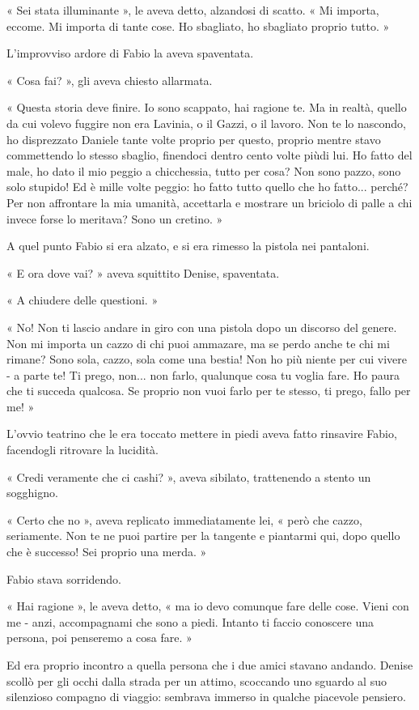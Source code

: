 « Sei stata illuminante », le aveva detto, alzandosi di scatto. « Mi importa, eccome. Mi importa di tante cose. Ho sbagliato, ho sbagliato proprio tutto. »

L'improvviso ardore di Fabio la aveva spaventata.

« Cosa fai? », gli aveva chiesto allarmata.

« Questa storia deve finire. Io sono scappato, hai ragione te. Ma in realtà, quello da cui volevo fuggire non era Lavinia, o il Gazzi, o il lavoro. Non te lo nascondo, ho disprezzato Daniele tante volte proprio per questo, proprio mentre stavo commettendo lo stesso sbaglio, finendoci dentro cento volte piùdi lui. Ho fatto del male, ho dato il mio peggio a chicchessia, tutto per cosa? Non sono pazzo, sono solo stupido! Ed è mille volte peggio: ho fatto tutto quello che ho fatto... perché? Per non affrontare la mia umanità, accettarla e mostrare un briciolo di palle a chi invece forse lo meritava? Sono un cretino. »

A quel punto Fabio si era alzato, e si era rimesso la pistola nei pantaloni.

« E ora dove vai? » aveva squittito Denise, spaventata.

« A chiudere delle questioni. »

« No! Non ti lascio andare in giro con una pistola dopo un discorso del genere. Non mi importa un cazzo di chi puoi ammazare, ma se perdo anche te chi mi rimane? Sono sola, cazzo, sola come una bestia! Non ho più niente per cui vivere - a parte te! Ti prego, non... non farlo, qualunque cosa tu voglia fare. Ho paura che ti succeda qualcosa. Se proprio non vuoi farlo per te stesso, ti prego, fallo per me! »

L'ovvio teatrino che le era toccato mettere in piedi aveva fatto rinsavire Fabio, facendogli ritrovare la lucidità.

« Credi veramente che ci cashi? », aveva sibilato, trattenendo a stento un sogghigno.

« Certo che no », aveva replicato immediatamente lei, « però che cazzo, seriamente. Non te ne puoi partire per la tangente e piantarmi qui, dopo quello che è successo! Sei proprio una merda. »

Fabio stava sorridendo.

« Hai ragione », le aveva detto, « ma io devo comunque fare delle cose. Vieni con me - anzi, accompagnami che sono a piedi. Intanto ti faccio conoscere una persona, poi penseremo a cosa fare. »

Ed era proprio incontro a quella persona che i due amici stavano andando. Denise scollò per gli occhi dalla strada per un attimo, scoccando uno sguardo al suo silenzioso compagno di viaggio: sembrava immerso in qualche piacevole pensiero.

